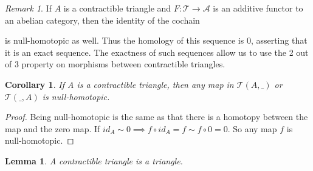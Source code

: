 \documentclass[12pt]{article}
\newtheorem{corollary}{Corollary}[theorem]
\newtheorem{lemma}[theorem]{Lemma}
\theoremstyle{definition}
\theoremstyle{remark}
\newtheorem*{remark}{Remark}
\begin{document}
            \begin{remark}
                If $A$ is a contractible triangle and $F:\mathcal{T}\rightarrow \mathcal{A}$ is an additive functor to an abelian category, then the identity of the cochain 
                \begin{center}
                \end{center}
                is null-homotopic as well. Thus the homology of this sequence is $0$, asserting that it is an exact sequence.
                The exactness of such sequences allow us to use the 2 out of 3 property on morphisms between contractible triangles.
            \end{remark}

            \begin{corollary}
                If A is a contractible triangle, then any map in $\mathcal{T}(A,\_)$ or $\mathcal{T}(\_,A)$ is null-homotopic.
            \end{corollary}

            \begin{proof}
                Being null-homotopic is the same as that there is a homotopy between the map and the zero map. If $id_A\sim 0 \implies f\circ id_A = f \sim f\circ 0 = 0$. So any map $f$ is null-homotopic.
            \end{proof}

            \begin{lemma}
                A contractible triangle is a triangle.
            \end{lemma}
\end{document}
